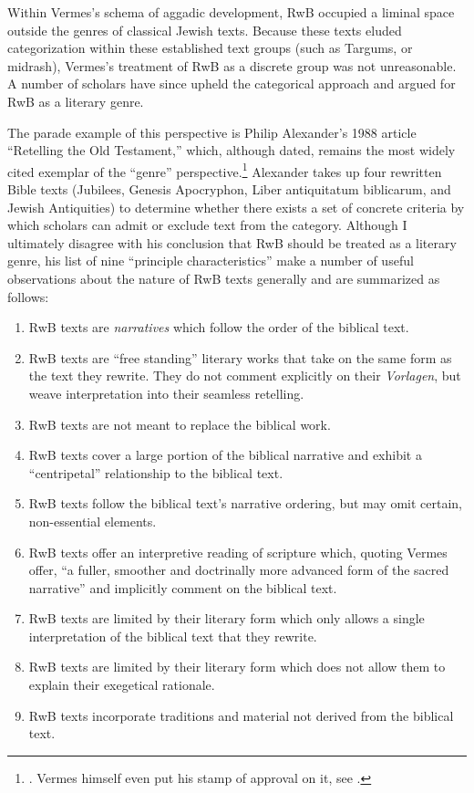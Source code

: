 Within Vermes's schema of aggadic development, RwB occupied a liminal
space outside the genres of classical Jewish texts. Because these texts
eluded categorization within these established text groups (such as
Targums, or midrash), Vermes's treatment of RwB as a discrete group was
not unreasonable. A number of scholars have since upheld the categorical
approach and argued for RwB as a literary genre.

The parade example of this perspective is Philip Alexander's 1988
article ``Retelling the Old Testament,'' which, although dated, remains
the most widely cited exemplar of the ``genre'' perspective.\footnote{\textcite{alexander_carson-williamson1988}.
  Vermes himself even put his stamp of approval on it, see
  \textcite[4]{vermes_zsengeller2014}.} Alexander takes up four
rewritten Bible texts (Jubilees, Genesis Apocryphon,
Liber antiquitatum biblicarum, and Jewish Antiquities) to determine
whether there exists a set of concrete criteria by which scholars can
admit or exclude text from the category. Although I ultimately disagree
with his conclusion that RwB should be treated as a literary genre, his
list of nine ``principle characteristics'' make a number of useful
observations about the nature of RwB texts generally and are summarized
as follows:

\begin{enumerate}
\def\labelenumi{\arabic{enumi}.}
\tightlist
\item
  RwB texts are \emph{narratives} which follow the order of the biblical
  text.
\item
  RwB texts are ``free standing'' literary works that take on the same
  form as the text they rewrite. They do not comment explicitly on their
  \emph{Vorlagen}, but weave interpretation into their seamless
  retelling.
\item
  RwB texts are not meant to replace the biblical work.
\item
  RwB texts cover a large portion of the biblical narrative and exhibit
  a ``centripetal'' relationship to the biblical text.
\item
  RwB texts follow the biblical text's narrative ordering, but may omit
  certain, non-essential elements.
\item
  RwB texts offer an interpretive reading of scripture which, quoting
  Vermes offer, ``a fuller, smoother and doctrinally more advanced form
  of the sacred narrative''\autocite[Citing Vermes in][305]{schurer1986}
  and implicitly comment on the biblical text.
\item
  RwB texts are limited by their literary form which only allows a
  single interpretation of the biblical text that they rewrite.
\item
  RwB texts are limited by their literary form which does not allow them
  to explain their exegetical rationale.
\item
  RwB texts incorporate traditions and material not derived from the
  biblical text.
\end{enumerate}

